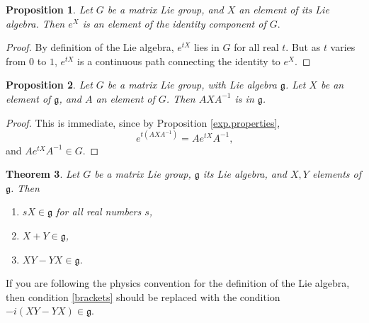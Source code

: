 \documentclass[12pt]{amsbook}
\let \frak = \mathfrak
\theoremstyle{plain}
\newtheorem{theorem}{Theorem}
\newtheorem{proposition}[theorem]{Proposition}
\numberwithin{equation}{chapter}
\numberwithin{theorem}{chapter}
\begin{document}
\begin{proposition}
\label{identity}Let $G$ be a matrix Lie group, and $X$ an element of its Lie
algebra. Then $e^{X}$ is an element of the identity component of $G.$
\end{proposition}

\begin{proof}
By definition of the Lie algebra, $e^{tX}$ lies in $G$ for all real $t$. But
as $t$ varies from $0$ to $1$, $e^{tX}$ is a continuous path connecting the
identity to $e^{X}$.
\end{proof}

\begin{proposition}
\label{adjoint}Let $G$ be a matrix Lie group, with Lie algebra $\frak{g}$. Let
$X$ be an element of $\frak{g}$, and $A$ an element of $G$. Then $AXA^{-1}$ is
in $\frak{g}$.
\end{proposition}

\begin{proof}
This is immediate, since by Proposition \ref{exp.properties},
\[
e^{t(AXA^{-1})}=Ae^{tX}A^{-1}\text{,}%
\]
and $Ae^{tX}A^{-1}\in G$.
\end{proof}

\begin{theorem}
\label{lie.algebra.theorem}Let $G$ be a matrix Lie group, $\frak{g}$ its Lie
algebra, and $X,Y$ elements of $\frak{g}$. Then

\begin{enumerate}
\item \label{scalars}$sX\in\frak{g}$ for all real numbers $s$,

\item \label{sums}$X+Y\in\frak{g}$,

\item \label{brackets}$XY-YX\in\frak{g}$.
\end{enumerate}
\end{theorem}

If you are following the physics convention for the definition of the Lie
algebra, then condition \ref{brackets} should be replaced with the condition
$-i\left(  XY-YX\right)  \in\frak{g}$.
\end{document}
